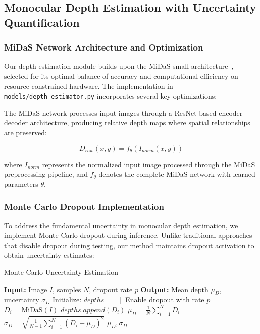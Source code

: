 \documentclass[12pt,oneside]{book}
\begin{document}
\subsection{Monocular Depth Estimation with Uncertainty Quantification}

\subsubsection{MiDaS Network Architecture and Optimization}

Our depth estimation module builds upon the MiDaS-small architecture~\cite{ranftl2020towards}, selected for its optimal balance of accuracy and computational efficiency on resource-constrained hardware. The implementation in \texttt{models/depth\_estimator.py} incorporates several key optimizations:

The MiDaS network processes input images through a ResNet-based encoder-decoder architecture, producing relative depth maps where spatial relationships are preserved:

\begin{equation}
D_{raw}(x,y) = f_{\theta}(I_{norm}(x,y))
\label{eq:midas_forward}
\end{equation}

where $I_{norm}$ represents the normalized input image processed through the MiDaS preprocessing pipeline, and $f_{\theta}$ denotes the complete MiDaS network with learned parameters $\theta$.

\subsubsection{Monte Carlo Dropout Implementation}

To address the fundamental uncertainty in monocular depth estimation, we implement Monte Carlo dropout during inference. Unlike traditional approaches that disable dropout during testing, our method maintains dropout activation to obtain uncertainty estimates:

\begin{algorithm}
\caption{Monte Carlo Uncertainty Estimation}
\begin{algorithmic}
\STATE \textbf{Input:} Image $I$, samples $N$, dropout rate $p$
\STATE \textbf{Output:} Mean depth $\mu_D$, uncertainty $\sigma_D$
\STATE Initialize: $depths = []$
    \STATE Enable dropout with rate $p$
    \STATE $D_i = \text{MiDaS}(I)$
    \STATE $depths.append(D_i)$
\ENDFOR
\STATE $\mu_D = \frac{1}{N} \sum_{i=1}^{N} D_i$
\STATE $\sigma_D = \sqrt{\frac{1}{N-1} \sum_{i=1}^{N} (D_i - \mu_D)^2}$
\RETURN $\mu_D, \sigma_D$
\end{algorithmic}
\end{algorithm}
\end{document}
